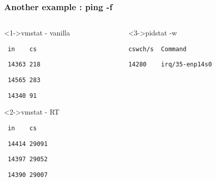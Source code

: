 \begin{frame}[fragile]
	\frametitle{Another example : ping -f}

	{}

	\begin{columns}
		\begin{column}[t]{0.3\linewidth}
			\begin{block}<1->{vmstat - vanilla}

			\verb+ in    cs +

			\verb+ 14363 218 +

			\verb+ 14565 283 +

			\verb+ 14340 91 +

			\end{block}
			\begin{block}<2->{vmstat - RT}

			\verb+ in    cs +

			\verb+ 14414 29091 +

			\verb+ 14397 29052 +

			\verb+ 14390 29007 +
			\end{block}
		\end{column}
		\begin{column}[t]{0.7\linewidth}
			\begin{block}<3->{pidstat -w}

		\verb+cswch/s  Command+

		\verb+14280    irq/35-enp14s0+
			\end{block}
		\end{column}
	\end{columns}

\end{frame}


